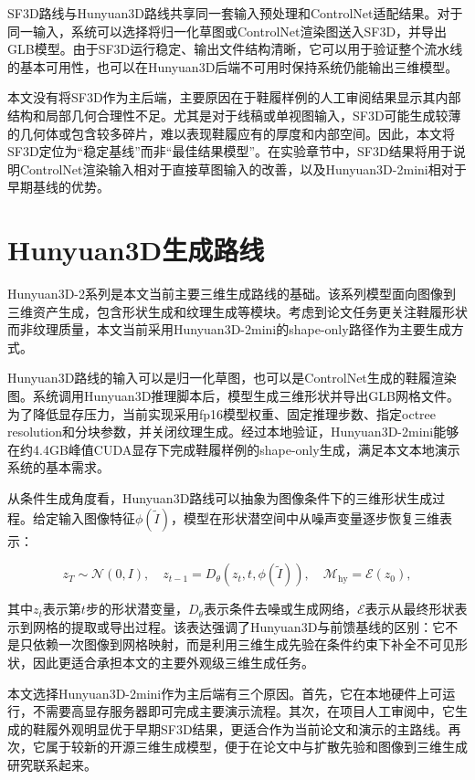 SF3D路线与Hunyuan3D路线共享同一套输入预处理和ControlNet适配结果。对于同一输入，系统可以选择将归一化草图或ControlNet渲染图送入SF3D，并导出GLB模型。由于SF3D运行稳定、输出文件结构清晰，它可以用于验证整个流水线的基本可用性，也可以在Hunyuan3D后端不可用时保持系统仍能输出三维模型。

本文没有将SF3D作为主后端，主要原因在于鞋履样例的人工审阅结果显示其内部结构和局部几何合理性不足。尤其是对于线稿或单视图输入，SF3D可能生成较薄的几何体或包含较多碎片，难以表现鞋履应有的厚度和内部空间。因此，本文将SF3D定位为“稳定基线”而非“最佳结果模型”。在实验章节中，SF3D结果将用于说明ControlNet渲染输入相对于直接草图输入的改善，以及Hunyuan3D-2mini相对于早期基线的优势。

\section{Hunyuan3D生成路线}

Hunyuan3D-2系列是本文当前主要三维生成路线的基础。该系列模型面向图像到三维资产生成，包含形状生成和纹理生成等模块\citep{hunyuan3d2025hunyuan3d2}。考虑到论文任务更关注鞋履形状而非纹理质量，本文当前采用Hunyuan3D-2mini的shape-only路径作为主要生成方式。

Hunyuan3D路线的输入可以是归一化草图，也可以是ControlNet生成的鞋履渲染图。系统调用Hunyuan3D推理脚本后，模型生成三维形状并导出GLB网格文件。为了降低显存压力，当前实现采用fp16模型权重、固定推理步数、指定octree resolution和分块参数，并关闭纹理生成。经过本地验证，Hunyuan3D-2mini能够在约4.4GB峰值CUDA显存下完成鞋履样例的shape-only生成，满足本文本地演示系统的基本需求。

从条件生成角度看，Hunyuan3D路线可以抽象为图像条件下的三维形状生成过程。给定输入图像特征$\phi(\tilde{I})$，模型在形状潜空间中从噪声变量逐步恢复三维表示：

\begin{equation}
  z_T \sim \mathcal{N}(0, I), \quad
  z_{t-1} = D_{\theta}(z_t, t, \phi(\tilde{I})),
  \quad
  \mathcal{M}_{\mathrm{hy}} = \mathcal{E}(z_0),
  \label{eq:hunyuan-generation}
\end{equation}

其中$z_t$表示第$t$步的形状潜变量，$D_{\theta}$表示条件去噪或生成网络，$\mathcal{E}$表示从最终形状表示到网格的提取或导出过程。该表达强调了Hunyuan3D与前馈基线的区别：它不是只依赖一次图像到网格映射，而是利用三维生成先验在条件约束下补全不可见形状，因此更适合承担本文的主要外观级三维生成任务。

本文选择Hunyuan3D-2mini作为主后端有三个原因。首先，它在本地硬件上可运行，不需要高显存服务器即可完成主要演示流程。其次，在项目人工审阅中，它生成的鞋履外观明显优于早期SF3D结果，更适合作为当前论文和演示的主路线。再次，它属于较新的开源三维生成模型，便于在论文中与扩散先验和图像到三维生成研究联系起来。

